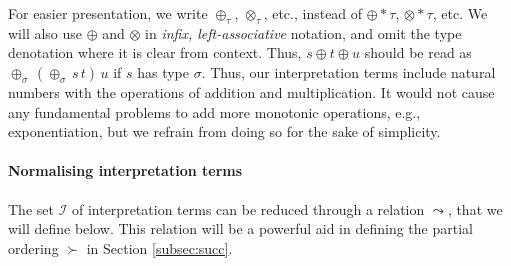 \documentclass[a4paper,UKenglish,cleveref,autoref,numberwithinsect]{lipics-v2019}
\theoremstyle{definition}
\newcommand{\Iterms}{\mathcal{I}}
\newcommand{\tapp}[2]{#1 * #2}
\newcommand{\arrW}{\leadsto}
\begin{document}
For easier presentation, we write $\oplus_\tau$, $\otimes_\tau$, etc.,
instead of $\tapp{\oplus}{\tau}$, $\tapp{\otimes}{\tau}$, etc. We will
also use $\oplus$ and $\otimes$ in \emph{infix, left-associative}
notation, and omit the type denotation where it is clear from
context. Thus, $s \oplus t \oplus u$ should be read as
$\oplus_\sigma\,(\oplus_\sigma\,s\,t)\,u$ if $s$ has type
$\sigma$. Thus, our interpretation terms include natural
  numbers with the operations of addition and multiplication. It would
  not cause any fundamental problems to add more monotonic operations, e.g.,
  exponentiation, but we refrain from doing so for the sake of
  simplicity.

\paragraph*{Normalising interpretation terms}

The set $\Iterms$ of interpretation terms can be reduced through
a relation $\arrW$, that we will define below.  This relation will
be a powerful aid in defining the partial ordering $\succ$ in Section
\ref{subsec:succ}.
\end{document}
